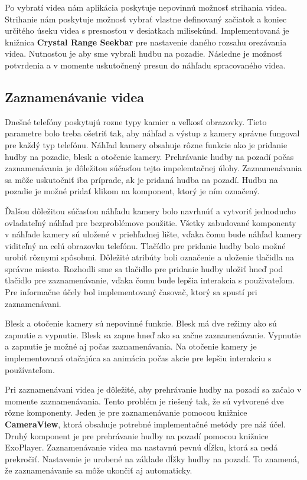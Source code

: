 \documentclass[12pt, oneside]{book}
\begin{document}
Po vybratí videa nám aplikácia poskytuje nepovinnú možnosť strihania videa. Strihanie nám poskytuje možnosť vybrať vlastne definovaný začiatok a koniec určitého úseku videa s presnosťou v desiatkach milisekúnd. Implementovaná je knižnica \textbf{Crystal Range Seekbar} pre nastavenie daného rozsahu orezávania videa. Nutnosťou je aby sme vybrali hudbu na pozadie. Následne je možnosť potvrdenia a v momente uskutočnený presun do náhľadu spracovaného videa.

\subsection{Zaznamenávanie videa}

\hspace{15pt} Dnešné telefóny poskytujú rozne typy kamier a veľkosť obrazovky. Tieto parametre bolo treba ošetriť tak, aby náhľad a výstup z kamery správne fungoval pre každý typ telefónu. Náhľad kamery obsahuje rôzne funkcie ako je pridanie hudby na pozadie, blesk a otočenie kamery. Prehrávanie hudby na pozadí počas zaznamenávania je dôležitou súčasťou tejto impelemtačnej úlohy. Zaznamenávania sa môže uskutočniť iba príprade, ak je pridaná hudba na pozadí. Hudbu na pozadie je možné pridať klikom na komponent, ktorý je ním označený. 

Ďalšou dôležitou súčasťou náhľadu kamery bolo navrhnúť a vytvoriť jednoducho ovladateľný náhľad pre bezproblémove použitie. Všetky zabudované komponenty v náhľade kamery sú uložené v priehľadnej lište, vďaka čomu bude náhľad kamery viditeľný na celú obrazovku telefónu. Tlačídlo pre pridanie hudby bolo možné urobiť rôznymi spôsobmi. Dôležité atribúty boli označenie a uloženie tlačidla na správne miesto. Rozhodli sme sa tlačidlo pre pridanie hudby uložiť hneď pod tlačidlo pre zaznamenávanie, vďaka čomu bude lepšia interakcia s použivateľom. Pre informačne účely bol implementovaný časovač, ktorý sa spustí pri zaznamenávani. 

Blesk a otočenie kamery sú nepovinné funkcie. Blesk má dve režimy ako sú zapnutie a vypnutie. Blesk sa zapne hneď ako sa začne zaznamenávanie. Vypnutie a zapnutie je možné aj počas zaznamenávania. Na otočenie kamery je implementovaná otačajúca sa animácia počas akcie pre lepšiu interakciu s používateľom. 

Pri zaznamenávani videa je dôležité, aby prehrávanie hudby na pozadí sa začalo v momente zaznamenávania. Tento problém je riešený tak, že sú vytvorené dve rôzne komponenty. Jeden je pre zaznamenávanie pomocou knižnice \textbf{CameraView}, ktorá obsahuje potrebné implementačné metódy pre náš účel. Druhý komponent je pre prehrávanie hudby na pozadí pomocou knižnice ExoPlayer. Zaznamenávanie videa ma nastavnú pevnú dĺžku, ktorá sa nedá prekročiť. Nastavenie je urobené na základe dĺžky hudby na pozadí. To znamená, že zaznamenávanie sa môže ukončiť aj automaticky.
\end{document}
